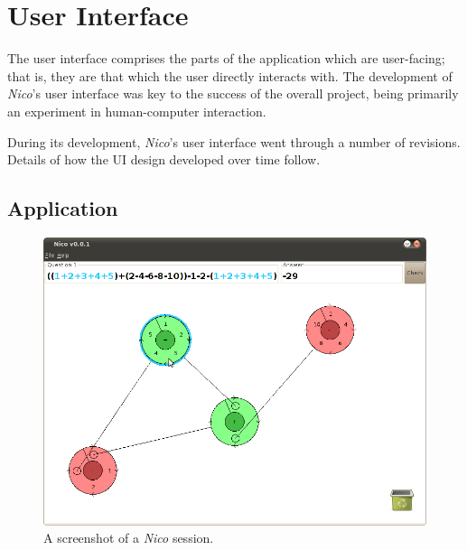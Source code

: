 \documentclass[12pt,twoside,notitlepage,xetex]{report}
\begin{document}
{\section{User Interface}%

The user interface comprises the parts of the application which are user-facing; that is, they are that which the user directly interacts with.  The development of \emph{Nico}'s user interface was key to the success of the overall project, being primarily an experiment in human-computer interaction.

During its development, \emph{Nico}'s user interface went through a number of revisions.  Details of how the UI design developed over time follow.

\subsection{Application}

\begin{center}
\begin{figure}[H]
\begin{center}
\includegraphics[width=\textwidth]{figs/nico_screen_01.png}
\end{center}
\caption{A screenshot of a \emph{Nico} session.}
\label{fig:Nico1}
\end{figure}
\end{center}

}
\end{document}
